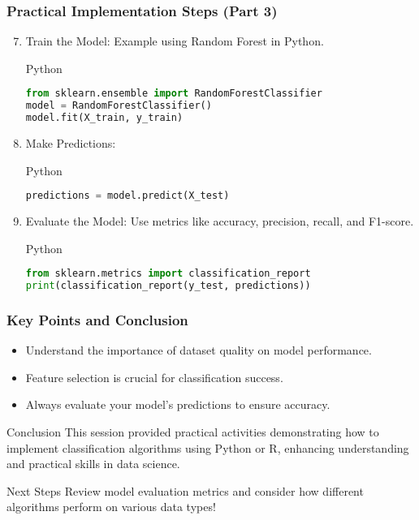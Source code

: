 \documentclass[aspectratio=169]{beamer}
\begin{document}
\begin{frame}[fragile]
    \frametitle{Practical Implementation Steps (Part 3)}
    \begin{enumerate}
        \setcounter{enumi}{6} %
        \item Train the Model: Example using Random Forest in Python.
        \begin{block}{Python}
            \begin{lstlisting}[language=Python]
from sklearn.ensemble import RandomForestClassifier
model = RandomForestClassifier()
model.fit(X_train, y_train)
            \end{lstlisting}
        \end{block}
        \item Make Predictions:
        \begin{block}{Python}
            \begin{lstlisting}[language=Python]
predictions = model.predict(X_test)
            \end{lstlisting}
        \end{block}
        \item Evaluate the Model: Use metrics like accuracy, precision, recall, and F1-score.
        \begin{block}{Python}
            \begin{lstlisting}[language=Python]
from sklearn.metrics import classification_report
print(classification_report(y_test, predictions))
            \end{lstlisting}
        \end{block}
    \end{enumerate}
\end{frame}

\begin{frame}[fragile]
    \frametitle{Key Points and Conclusion}
    \begin{itemize}
        \item Understand the importance of dataset quality on model performance.
        \item Feature selection is crucial for classification success.
        \item Always evaluate your model's predictions to ensure accuracy.
    \end{itemize}
    \begin{block}{Conclusion}
        This session provided practical activities demonstrating how to implement classification algorithms using Python or R, enhancing understanding and practical skills in data science.
    \end{block}
    \begin{block}{Next Steps}
        Review model evaluation metrics and consider how different algorithms perform on various data types!
    \end{block}
\end{frame}
\end{document}
